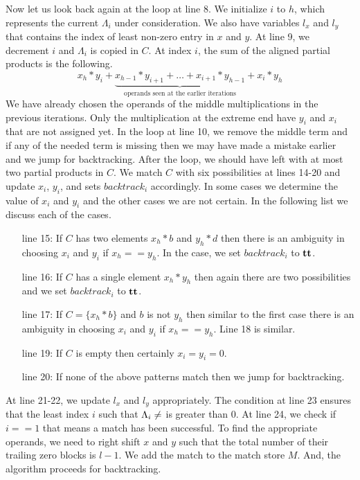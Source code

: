Now let us look back again at the loop at line 8.
%
We initialize $i$ to $h$, which represents the current $\Lambda_i$ under
consideration.
%
We also have variables $l_x$ and $l_y$ that contains the index of
least non-zero entry in $x$ and $y$.
%
At line 9, we decrement $i$ and $\Lambda_i$ is copied in $C$.
%
At index $i$, the sum of the aligned partial products is the following.
$$
x_{h}*y_{i} + \underbrace{x_{h-1}*y_{i+1} + \dots + x_{i+1}*y_{h-1}}_{\text{operands seen at the earlier iterations}} + x_{i}*y_{h}
$$
We have already chosen the operands of the middle multiplications in the previous iterations.
%
Only the multiplication at the extreme end have $y_i$ and $x_i$ that are
not assigned yet.
%
In the loop at line 10, we remove the middle term and if any of the needed
term is missing then we may have made a mistake earlier and we jump for
backtracking.
%
After the loop, we should have left with at most two partial products in $C$.
%
We match $C$ with six possibilities at lines 14-20 and
update $x_i$, $y_i$, and sets $backtrack_i$ accordingly.
%
In some cases we determine the value of $x_i$ and $y_i$ and the other
cases we are not certain. 
%
In the following list we discuss each of the cases.
%
\begin{itemize}
\item[line 15:] If $C$ has two elements $x_h*b$ and $y_h*d$ then
there is an ambiguity in choosing $x_i$ and $y_i$
if $x_h == y_h$.
%
In the case, we set $backtrack_i$ to $\mathbf{tt}$.
\item[line 16:] If $C$ has a single element $x_h*y_h$ then again there  
are two possibilities and we set $backtrack_i$ to $\mathbf{tt}$.
\item[line 17:] If $C = \{x_h*b\}$ and $b$ is not $y_h$ then 
  similar to the first case there is an ambiguity in
  choosing $x_i$ and $y_i$ if $x_h == y_h$. Line 18 is similar.
\item[line 19:] If $C$ is empty then certainly $x_i = y_i = 0$.
\item[line 20:] If none of the above patterns match then we jump for
  backtracking.
\end{itemize}
%
At line 21-22, we update $l_x$ and $l_y$ appropriately.
%
The condition at line 23 ensures that the least index $i$ such that
$\Lambda_i \neq \empty$ is greater than 0.    
%
At line 24, we check if $i==1$ that means a match has been successful.
%
To find the appropriate operands, we need to right shift $x$ and $y$
such that the total number of their trailing zero blocks is $l-1$.
%
We add the match to the match store $M$.
%
And, the algorithm proceeds for backtracking.

